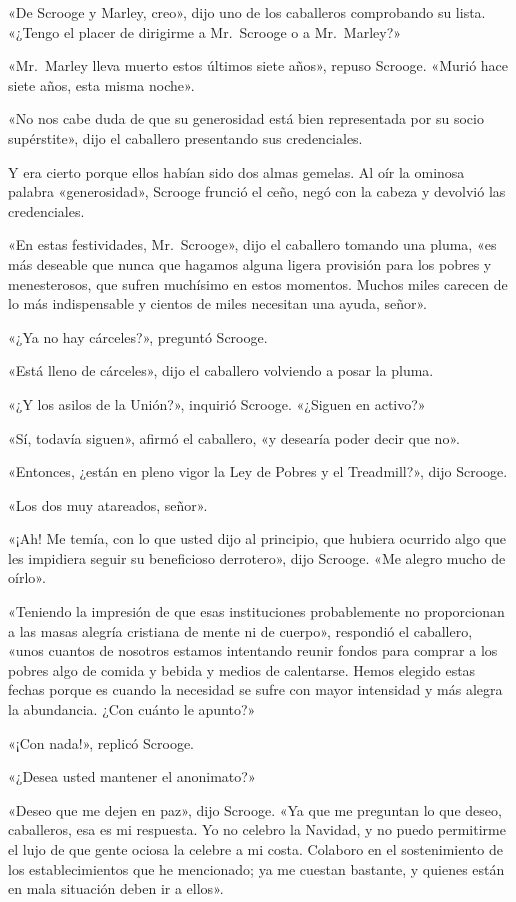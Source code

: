 \documentclass{novela}
\begin{document}
 «De Scrooge y Marley, creo», dijo uno de los caballeros comprobando su lista. «¿Tengo el placer de dirigirme a Mr.~Scrooge o a Mr.~Marley?»

 «Mr.~Marley lleva muerto estos últimos siete años», repuso Scrooge. «Murió hace siete años, esta misma noche».

 «No nos cabe duda de que su generosidad está bien representada por su socio supérstite», dijo el caballero presentando sus credenciales.

 Y era cierto porque ellos habían sido dos almas gemelas. Al oír la ominosa palabra «generosidad», Scrooge frunció el ceño, negó con la cabeza y devolvió las credenciales.

 «En estas festividades, Mr.~Scrooge», dijo el caballero tomando una pluma, «es más deseable que nunca que hagamos alguna ligera provisión para los pobres y menesterosos, que sufren muchísimo en estos momentos. Muchos miles carecen de lo más indispensable y cientos de miles necesitan una ayuda, señor».

 «¿Ya no hay cárceles?», preguntó Scrooge.

 «Está lleno de cárceles», dijo el caballero volviendo a posar la pluma.

 «¿Y los asilos de la Unión?», inquirió Scrooge. «¿Siguen en activo?»

 «Sí, todavía siguen», afirmó el caballero, «y desearía poder decir que no».

 «Entonces, ¿están en pleno vigor la Ley de Pobres y el Treadmill?», dijo Scrooge.

 «Los dos muy atareados, señor».

 «¡Ah! Me temía, con lo que usted dijo al principio, que hubiera ocurrido algo que les impidiera seguir su beneficioso derrotero», dijo Scrooge. «Me alegro mucho de oírlo».

 «Teniendo la impresión de que esas instituciones probablemente no proporcionan a las masas alegría cristiana de mente ni de cuerpo», respondió el caballero, «unos cuantos de nosotros estamos intentando reunir fondos para comprar a los pobres algo de comida y bebida y medios de calentarse. Hemos elegido estas fechas porque es cuando la necesidad se sufre con mayor intensidad y más alegra la abundancia. ¿Con cuánto le apunto?»

 «¡Con nada!», replicó Scrooge.

 «¿Desea usted mantener el anonimato?»

 «Deseo que me dejen en paz», dijo Scrooge. «Ya que me preguntan lo que deseo, caballeros, esa es mi respuesta. Yo no celebro la Navidad, y no puedo permitirme el lujo de que gente ociosa la celebre a mi costa. Colaboro en el sostenimiento de los establecimientos que he mencionado; ya me cuestan bastante, y quienes están en mala situación deben ir a ellos».
\end{document}
